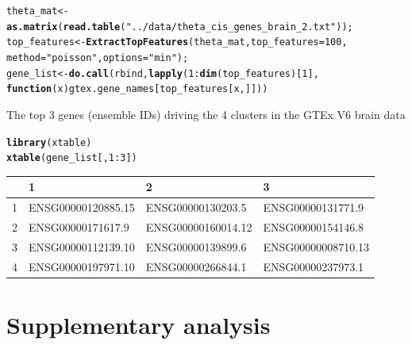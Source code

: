 \documentclass[12pt]{article}\usepackage[]{graphicx}\usepackage[usenames,dvipsnames]{color}
\makeatletter
\newcommand{\hlnum}[1]{\textcolor[rgb]{0.686,0.059,0.569}{#1}}%
\newcommand{\hlstr}[1]{\textcolor[rgb]{0.192,0.494,0.8}{#1}}%
\newcommand{\hlopt}[1]{\textcolor[rgb]{0,0,0}{#1}}%
\newcommand{\hlstd}[1]{\textcolor[rgb]{0.345,0.345,0.345}{#1}}%
\newcommand{\hlkwa}[1]{\textcolor[rgb]{0.161,0.373,0.58}{\textbf{#1}}}%
\newcommand{\hlkwb}[1]{\textcolor[rgb]{0.69,0.353,0.396}{#1}}%
\newcommand{\hlkwc}[1]{\textcolor[rgb]{0.333,0.667,0.333}{#1}}%
\newcommand{\hlkwd}[1]{\textcolor[rgb]{0.737,0.353,0.396}{\textbf{#1}}}%
\newenvironment{kframe}{%
 \def\at@end@of@kframe{}%
 \ifinner\ifhmode%
  \def\at@end@of@kframe{\end{minipage}}%
  \begin{minipage}{\columnwidth}%
 \fi\fi%
 \def\FrameCommand##1{\hskip\@totalleftmargin \hskip-\fboxsep
 \colorbox{shadecolor}{##1}\hskip-\fboxsep
     \hskip-\linewidth \hskip-\@totalleftmargin \hskip\columnwidth}%
 \MakeFramed {\advance\hsize-\width
   \@totalleftmargin\z@ \linewidth\hsize
   \@setminipage}}%
 {\par\unskip\endMakeFramed%
 \at@end@of@kframe}
\newenvironment{knitrout}{}{} %
\makeatother
\begin{document}
\begin{knitrout}
\color{fgcolor}\begin{kframe}
\begin{alltt}
\hlstd{theta_mat} \hlkwb{<-} \hlkwd{as.matrix}\hlstd{(}\hlkwd{read.table}\hlstd{(}\hlstr{"../data/theta_cis_genes_brain_2.txt"}\hlstd{));}
\hlstd{top_features} \hlkwb{<-} \hlkwd{ExtractTopFeatures}\hlstd{(theta_mat,} \hlkwc{top_features}\hlstd{=}\hlnum{100}\hlstd{,}
                                   \hlkwc{method}\hlstd{=}\hlstr{"poisson"}\hlstd{,} \hlkwc{options}\hlstd{=}\hlstr{"min"}\hlstd{);}
\hlstd{gene_list} \hlkwb{<-} \hlkwd{do.call}\hlstd{(rbind,} \hlkwd{lapply}\hlstd{(}\hlnum{1}\hlopt{:}\hlkwd{dim}\hlstd{(top_features)[}\hlnum{1}\hlstd{],}
                        \hlkwa{function}\hlstd{(}\hlkwc{x}\hlstd{) gtex.gene_names[top_features[x,]]))}
\end{alltt}
\end{kframe}
\end{knitrout}

The top 3 genes (ensemble IDs) driving the 4 clusters in the GTEx V6 brain data

\begin{knitrout}
\color{fgcolor}\begin{kframe}
\begin{alltt}
\hlkwd{library}\hlstd{(xtable)}
\hlkwd{xtable}\hlstd{(gene_list[,}\hlnum{1}\hlopt{:}\hlnum{3}\hlstd{])}
\end{alltt}
\end{kframe}
\end{knitrout}

\begin{table}[ht]
\centering
\begin{tabular}{rlll}
  \hline
 & 1 & 2 & 3 \\
  \hline
  1 & ENSG00000120885.15 & ENSG00000130203.5 & ENSG00000131771.9 \\
  2 & ENSG00000171617.9 & ENSG00000160014.12 & ENSG00000154146.8 \\
  3 & ENSG00000112139.10 & ENSG00000139899.6 & ENSG00000008710.13 \\
  4 & ENSG00000197971.10 & ENSG00000266844.1 & ENSG00000237973.1 \\
   \hline
\end{tabular}
\end{table}

\section{Supplementary analysis}
\end{document}
